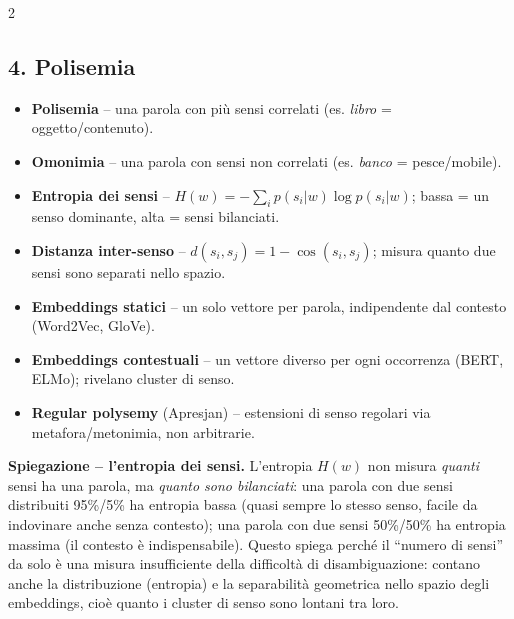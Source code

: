 \documentclass[10pt,a4paper]{extarticle}
\begin{document}
\begin{multicols}{2}
\subsection*{4. Polisemia}
\begin{itemize}
\item \textbf{Polisemia} -- una parola con pi\`u sensi correlati (es. \emph{libro} = oggetto/contenuto).
\item \textbf{Omonimia} -- una parola con sensi non correlati (es. \emph{banco} = pesce/mobile).
\item \textbf{Entropia dei sensi} -- $H(w)=-\sum_i p(s_i|w)\log p(s_i|w)$; bassa = un senso dominante, alta = sensi bilanciati.
\item \textbf{Distanza inter-senso} -- $d(s_i,s_j)=1-\cos(s_i,s_j)$; misura quanto due sensi sono separati nello spazio.
\item \textbf{Embeddings statici} -- un solo vettore per parola, indipendente dal contesto (Word2Vec, GloVe).
\item \textbf{Embeddings contestuali} -- un vettore diverso per ogni occorrenza (BERT, ELMo); rivelano cluster di senso.
\item \textbf{Regular polysemy} (Apresjan) -- estensioni di senso regolari via metafora/metonimia, non arbitrarie.
\end{itemize}
\smallskip\noindent\textbf{\textcolor{blue!45!black}{Spiegazione -- l'entropia dei sensi.}} L'entropia $H(w)$ non misura \emph{quanti} sensi ha una parola, ma \emph{quanto sono bilanciati}: una parola con due sensi distribuiti 95\%/5\% ha entropia bassa (quasi sempre lo stesso senso, facile da indovinare anche senza contesto); una parola con due sensi 50\%/50\% ha entropia massima (il contesto \`e indispensabile). Questo spiega perch\'e il ``numero di sensi'' da solo \`e una misura insufficiente della difficolt\`a di disambiguazione: contano anche la distribuzione (entropia) e la separabilit\`a geometrica nello spazio degli embeddings, cio\`e quanto i cluster di senso sono lontani tra loro.


\end{multicols}
\end{document}
